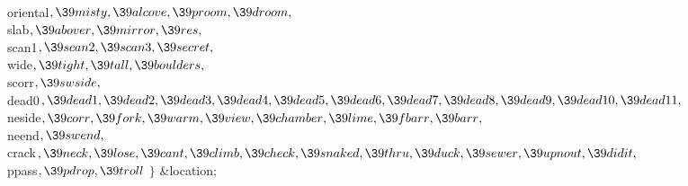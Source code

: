 \\{oriental}${},\39\\{misty},\39\\{alcove},\39\\{proom},\39\\{droom},{}$\6
\\{slab}${},\39\\{abover},\39\\{mirror},\39\\{res},{}$\6
\\{scan1}${},\39\\{scan2},\39\\{scan3},\39\\{secret},{}$\6
\\{wide}${},\39\\{tight},\39\\{tall},\39\\{boulders},{}$\6
\\{scorr}${},\39\\{swside},{}$\6
\\{dead0}${},\39\\{dead1},\39\\{dead2},\39\\{dead3},\39\\{dead4},\39\\{dead5},\39\\{dead6},\39\\{dead7},\39\\{dead8},\39\\{dead9},\39\\{dead10},\39\\{dead11},{}$\6
\\{neside}${},\39\\{corr},\39\\{fork},\39\\{warm},\39\\{view},\39\\{chamber},\39\\{lime},\39\\{fbarr},\39\\{barr},{}$\6
\\{neend}${},\39\\{swend},{}$\6
\\{crack}${},\39\\{neck},\39\\{lose},\39\\{cant},\39\\{climb},\39\\{check},\39\\{snaked},\39\\{thru},\39\\{duck},\39\\{sewer},\39\\{upnout},\39\\{didit},{}$\6
\\{ppass}${},\39\\{pdrop},\39\\{troll}{}$\2\6
${}\}{}$ \&{location};\par
\fi

